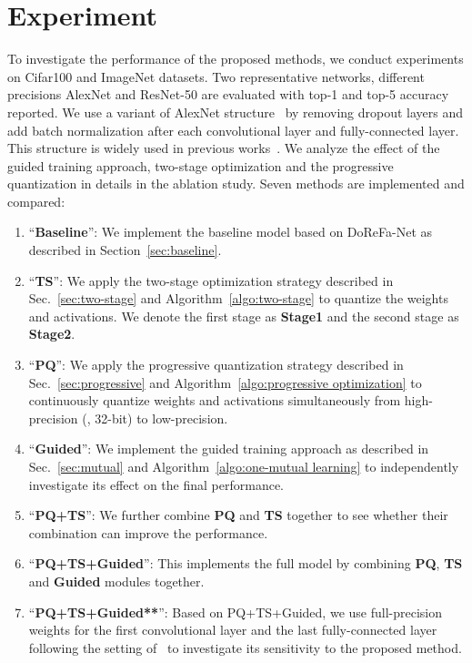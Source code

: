 \section{Experiment}

To investigate the performance of the proposed methods, we conduct experiments on Cifar100 and ImageNet datasets. Two representative networks, different precisions AlexNet and ResNet-50 are evaluated with top-1 and top-5 accuracy reported. We use a variant of AlexNet structure~\cite{krizhevsky2012imagenet} by removing dropout layers and add batch normalization after each convolutional layer and fully-connected layer. This structure is widely used in previous works~\cite{zhou2016dorefa, zhu2016trained}.  We analyze the effect of the guided training approach, two-stage optimization and the progressive quantization in details in the ablation study. Seven methods are implemented and compared:

\begin{enumerate}
\item ``\textbf{Baseline}'': We implement the baseline model based on DoReFa-Net as described in Section~\ref{sec:baseline}.

\item ``\textbf{TS}'': We apply the two-stage optimization strategy described in  Sec.~\ref{sec:two-stage} and Algorithm~\ref{algo:two-stage} to quantize the weights and activations. We denote the first stage as \textbf{Stage1} and the second stage as \textbf{Stage2}.

\item ``\textbf{PQ}'': We apply the progressive quantization strategy described in  Sec.~\ref{sec:progressive} and Algorithm~\ref{algo:progressive optimization} to continuously quantize weights and activations simultaneously from high-precision (\ie, 32-bit) to low-precision.

\item ``\textbf{Guided}'': We implement the guided training approach as described in Sec.~\ref{sec:mutual} and Algorithm~\ref{algo:one-mutual learning} to independently investigate its effect on the final performance.


\item ``\textbf{PQ+TS}'': We further combine \textbf{PQ} and \textbf{TS} together to see whether their combination can improve the performance.

\item ``\textbf{PQ+TS+Guided}'': This implements the full model by combining \textbf{PQ}, \textbf{TS} and \textbf{Guided} modules together.

\item ``\textbf{PQ+TS+Guided**}'': Based on PQ\-+\-TS\-+\-Guided, we use full-precision weights for the first convolutional layer and the last fully-connected layer following the setting of~\cite{zhu2016trained, zhou2016dorefa} to investigate its sensitivity to the proposed method.
\end{enumerate}



